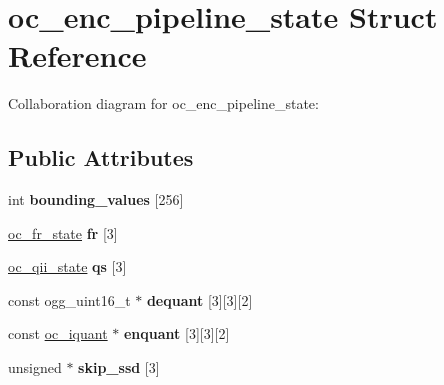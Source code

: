 \hypertarget{structoc__enc__pipeline__state}{\section{oc\+\_\+enc\+\_\+pipeline\+\_\+state Struct Reference}
\label{structoc__enc__pipeline__state}
}


Collaboration diagram for oc\+\_\+enc\+\_\+pipeline\+\_\+state\+:
\subsection*{Public Attributes}
\begin{DoxyCompactItemize}
\item 
\hypertarget{structoc__enc__pipeline__state_a0cde6a80cfd9c61281b20f321988e2f8}{int {\bfseries bounding\+\_\+values} \mbox{[}256\mbox{]}}\label{structoc__enc__pipeline__state_a0cde6a80cfd9c61281b20f321988e2f8}

\item 
\hypertarget{structoc__enc__pipeline__state_a3b0ee3f74fcc69e37e693744955b56ef}{\hyperlink{structoc__fr__state}{oc\+\_\+fr\+\_\+state} {\bfseries fr} \mbox{[}3\mbox{]}}\label{structoc__enc__pipeline__state_a3b0ee3f74fcc69e37e693744955b56ef}

\item 
\hypertarget{structoc__enc__pipeline__state_ad862da22cbaa8c72f1705dd99b2b6cc2}{\hyperlink{structoc__qii__state}{oc\+\_\+qii\+\_\+state} {\bfseries qs} \mbox{[}3\mbox{]}}\label{structoc__enc__pipeline__state_ad862da22cbaa8c72f1705dd99b2b6cc2}

\item 
\hypertarget{structoc__enc__pipeline__state_a83a10a998c668bfb6dc34eba46f7f1ce}{const ogg\+\_\+uint16\+\_\+t $\ast$ {\bfseries dequant} \mbox{[}3\mbox{]}\mbox{[}3\mbox{]}\mbox{[}2\mbox{]}}\label{structoc__enc__pipeline__state_a83a10a998c668bfb6dc34eba46f7f1ce}

\item 
\hypertarget{structoc__enc__pipeline__state_a64a7c206bc99e4b8fbc26500635af825}{const \hyperlink{structoc__iquant}{oc\+\_\+iquant} $\ast$ {\bfseries enquant} \mbox{[}3\mbox{]}\mbox{[}3\mbox{]}\mbox{[}2\mbox{]}}\label{structoc__enc__pipeline__state_a64a7c206bc99e4b8fbc26500635af825}

\item 
\hypertarget{structoc__enc__pipeline__state_a3d85ceabfe997574e2f35c2933814d27}{unsigned $\ast$ {\bfseries skip\+\_\+ssd} \mbox{[}3\mbox{]}}\label{structoc__enc__pipeline__state_a3d85ceabfe997574e2f35c2933814d27}


\end{DoxyCompactItemize}
